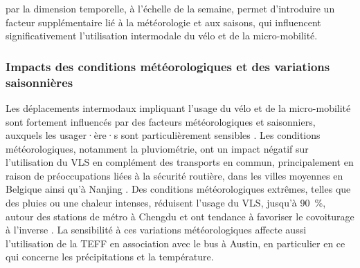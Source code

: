 \begin{refsegment}
par la dimension temporelle, à l'échelle de la semaine, permet d'introduire un facteur supplémentaire lié à la météorologie et aux saisons, qui influencent significativement l'utilisation intermodale du vélo et de la micro-mobilité.%

\subsubsection*{Impacts des conditions météorologiques et des variations saisonnières
    \label{chap2:impacts-meteo-saisons}
    }
    
Les déplacements intermodaux impliquant l'usage du vélo et de la micro-mobilité sont fortement influencés par des facteurs météorologiques et saisonniers, auxquels les usager·ère·s sont particulièrement sensibles \textcolor{blue}{\autocite[81]{flamm_determinants_2013}}. Les conditions météorologiques, notamment la pluviométrie, ont un impact négatif sur l'utilisation du \acrshort{VLS} en complément des transports en commun, principalement en raison de préoccupations liées à la sécurité routière, dans les villes moyennes en Belgique \textcolor{blue}{\autocite[8]{adnan_last-mile_2019}} ainsi qu'à Nanjing \textcolor{blue}{\autocite[67]{ma_understanding_2018}}. Des conditions météorologiques extrêmes, telles que des pluies ou une chaleur intenses, réduisent l'usage du \acrshort{VLS}, jusqu'à 90~\%, autour des stations de métro à Chengdu et ont tendance à favoriser le covoiturage à l'inverse \textcolor{blue}{\autocite[889]{bi_analysis_2021}}. La sensibilité à ces variations météorologiques affecte aussi l'utilisation de la \acrshort{TEFF} en association avec le bus à Austin, en particulier en ce qui concerne les précipitations et la température.%


\end{refsegment}

